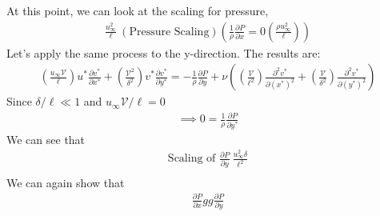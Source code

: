 At this point, we can look at the scaling for pressure,
\begin{gather*}
    \frac{u_{\infty}^2}{\ell} ~ (\text{Pressure Scaling}) \left(\frac{1}{\rho}
    \frac{\partial P}{\partial x} = 0 \left(\frac{\rho u_{\infty}^2}{\ell}\right)\right)
\end{gather*}
Let's apply the same process to the y-direction. The results are:
\begin{gather*}
    \left(\frac{u_{\infty} \mathcal{V}}{\ell}\right) u^* \frac{\partial v^*}{\partial x^*} + \left(\frac{\mathcal{V}^2}{\delta^2}\right) v^* \frac{\partial v^*}{\partial y^*} = -\frac{1}{\rho} \frac{\partial P}{\partial y} + \nu \left(\left(\frac{\mathcal{V}}{\ell^2}\right) \frac{\partial^2 v^*}{\partial (x^*)^2} + \left(\frac{\mathcal{V}}{\delta^2}\right) \frac{\partial^2 v^*}{\partial (y^*)^2}\right) 
\end{gather*}
Since $\delta/\ell \ll 1$ and $u_{\infty} \mathcal{V}/\ell = 0$
\begin{gather*}
    \implies 0 = \frac{1}{\rho} \frac{\partial P}{\partial y^*} 
\end{gather*}
We can see that 
\begin{gather*}
    \text{Scaling of } \frac{\partial P}{\partial y} ~ \frac{u_{\infty}^2 \delta}{\ell^2} \\
\end{gather*}
We can again show that 
\begin{gather*}
    \frac{\partial P}{\partial x} gg \frac{\partial P}{\partial y} 
\end{gather*}